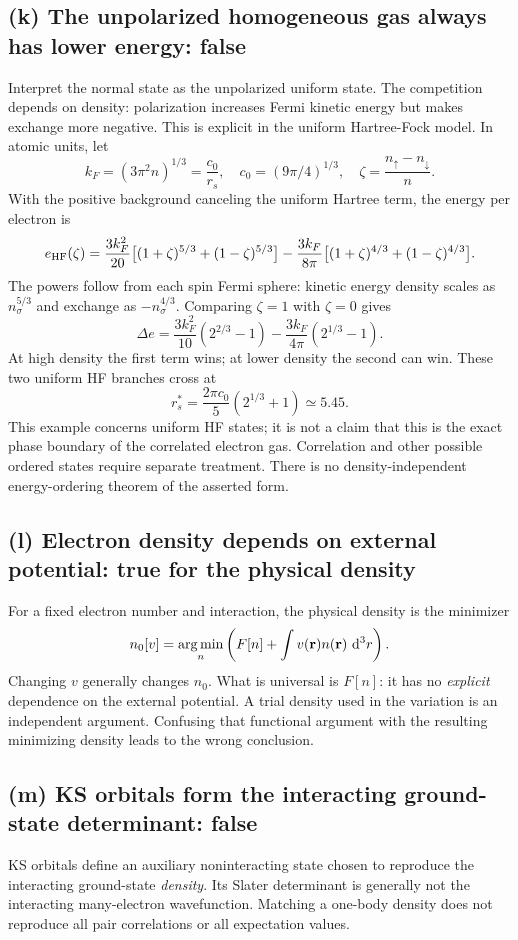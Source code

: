 \subsection*{(k) The unpolarized homogeneous gas always has lower energy: false}
Interpret the normal state as the unpolarized uniform state. The competition depends on density: polarization increases Fermi kinetic energy but makes exchange more negative. This is explicit in the uniform Hartree-Fock model. In atomic units, let
\[
k_F=(3\pi^2n)^{1/3}=\frac{c_0}{r_s},\quad
c_0=(9\pi/4)^{1/3},\quad
\zeta=\frac{n_\uparrow-n_\downarrow}{n}.
\]
With the positive background canceling the uniform Hartree term, the energy per electron is
\[
e_{\rm HF}(\zeta)=
\frac{3k_F^2}{20}\big[(1+\zeta)^{5/3}+(1-\zeta)^{5/3}\big]
-\frac{3k_F}{8\pi}\big[(1+\zeta)^{4/3}+(1-\zeta)^{4/3}\big].
\]
The powers follow from each spin Fermi sphere: kinetic energy density scales as $n_\sigma^{5/3}$ and exchange as $-n_\sigma^{4/3}$. Comparing $\zeta=1$ with $\zeta=0$ gives
\[
\Delta e=\frac{3k_F^2}{10}(2^{2/3}-1)
-\frac{3k_F}{4\pi}(2^{1/3}-1).
\]
At high density the first term wins; at lower density the second can win. These two uniform HF branches cross at
\[
r_s^*=\frac{2\pi c_0}{5}(2^{1/3}+1)\simeq5.45.
\]
This example concerns uniform HF states; it is not a claim that this is the exact phase boundary of the correlated electron gas. Correlation and other possible ordered states require separate treatment. There is no density-independent energy-ordering theorem of the asserted form.

\subsection*{(l) Electron density depends on external potential: true for the physical density}
For a fixed electron number and interaction, the physical density is the minimizer
\[
n_0[v]=\mathop{\rm arg\,min}_n\left(F[n]+\int v(\mathbf r)n(\mathbf r)\,\mathop{}\!\mathrm{d}^3r\right).
\]
Changing $v$ generally changes $n_0$. What is universal is $F[n]$: it has no \emph{explicit} dependence on the external potential. A trial density used in the variation is an independent argument. Confusing that functional argument with the resulting minimizing density leads to the wrong conclusion.

\subsection*{(m) KS orbitals form the interacting ground-state determinant: false}
KS orbitals define an auxiliary noninteracting state chosen to reproduce the interacting ground-state \emph{density}. Its Slater determinant is generally not the interacting many-electron wavefunction. Matching a one-body density does not reproduce all pair correlations or all expectation values.


